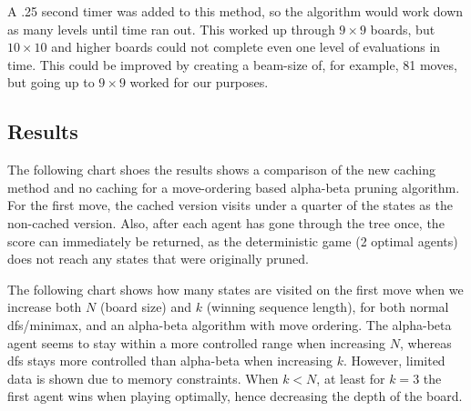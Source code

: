 \documentclass[12pt]{article}
\begin{document}
A .25 second timer was added to this method, so the algorithm would work down as many levels until time ran out. This worked up through \(9\times9\) boards, but \(10\times10\) and higher boards could not complete even one level of evaluations in time. This could be improved by creating a beam-size of, for example, 81 moves, but going up to \(9\times9\) worked for our purposes.


\subsection*{Results}
The following chart shoes the results shows a comparison of the new caching method and no caching for a move-ordering based alpha-beta pruning algorithm. For the first move, the cached version visits under a quarter of the states as the non-cached version. Also, after each agent has gone through the tree once, the score can immediately be returned, as the deterministic game (2 optimal agents) does not reach any states that were originally pruned.

\begin{center}
\end{center}

The following chart shows how many states are visited on the first move when we increase both \(N\) (board size) and \(k\) (winning sequence length), for both normal dfs/minimax, and an alpha-beta algorithm with move ordering. The alpha-beta agent seems to stay within a more controlled range when increasing \(N\), whereas dfs stays more controlled than alpha-beta when increasing \(k\). However, limited data is shown due to memory constraints. When \(k<N\), at least for \(k=3\) the first agent wins when playing optimally, hence decreasing the depth of the board.
\end{document}
